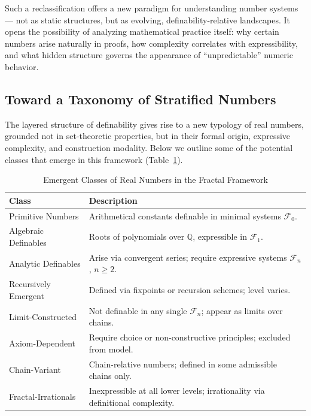\documentclass[12pt]{article}
\theoremstyle{definition}
\theoremstyle{plain}
\theoremstyle{remark}
\begin{document}
Such a reclassification offers a new paradigm for understanding number systems — not as static structures, but as evolving, definability-relative landscapes. It opens the possibility of analyzing mathematical practice itself: why certain numbers arise naturally in proofs, how complexity correlates with expressibility, and what hidden structure governs the appearance of ``unpredictable'' numeric behavior.

\subsection*{Toward a Taxonomy of Stratified Numbers}

The layered structure of definability gives rise to a new typology of real numbers, grounded not in set-theoretic properties, but in their formal origin, expressive complexity, and construction modality. Below we outline some of the potential classes that emerge in this framework (Table~\ref{tab:stratified-classes}).

\begin{table}[ht]
\centering
\renewcommand{\arraystretch}{1.25}
\begin{tabular}{@{}p{4.2cm}p{9.6cm}@{}}
\toprule
\textbf{Class} & \textbf{Description} \\
\midrule
Primitive Numbers & Arithmetical constants definable in minimal systems \( \mathcal{F}_0 \). \\
Algebraic Definables & Roots of polynomials over \( \mathbb{Q} \), expressible in \( \mathcal{F}_1 \). \\
Analytic Definables & Arise via convergent series; require expressive systems \( \mathcal{F}_n \), \( n \geq 2 \). \\
Recursively Emergent & Defined via fixpoints or recursion schemes; level varies. \\
Limit-Constructed & Not definable in any single \( \mathcal{F}_n \); appear as limits over chains. \\
Axiom-Dependent & Require choice or non-constructive principles; excluded from model. \\
Chain-Variant & Chain-relative numbers; defined in some admissible chains only. \\
Fractal-Irrationals & Inexpressible at all lower levels; irrationality via definitional complexity. \\
\bottomrule
\end{tabular}
\caption{Emergent Classes of Real Numbers in the Fractal Framework}
\label{tab:stratified-classes}
\end{table}
\end{document}
